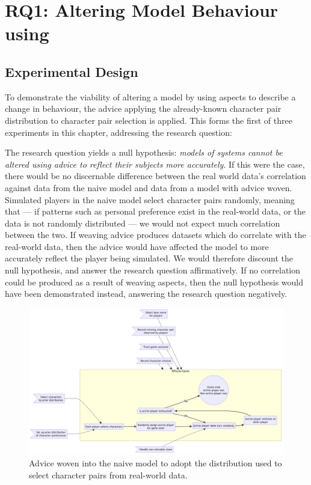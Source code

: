 \section{RQ1: Altering Model Behaviour using \AspectOrientation}
\label{sec:rq2}

\subsection{Experimental Design}

To demonstrate the viability of altering a model by using aspects to describe a
change in behaviour, the advice applying the already-known character pair
distribution to character pair selection is applied. This forms the first of
three experiments in this chapter, addressing the research question:

\begin{researchquestion}
\rqtwo{}
\end{researchquestion}

The research question yields a null hypothesis: \emph{models of systems cannot
be altered using advice to reflect their subjects more accurately}. If this were
the case, there would be no discernable difference between the real world data's
correlation against data from the naive model and data from a model with advice
woven. Simulated players in the naive model select character pairs randomly,
meaning that --- if patterns such as personal preference exist in the real-world
data, or the data is not randomly distributed --- we would not expect much
correlation between the two. If weaving advice produces datasets which do
correlate with the real-world data, then the advice would have affected the
model to more accurately reflect the player being simulated. We would therefore
discount the null hypothesis, and answer the research question affirmatively. If
no correlation could be produced as a result of weaving aspects, then the null
hypothesis would have been demonstrated instead, answering the research question
negatively.

\begin{figure}[h]
  \centering
  \includegraphics[width=\columnwidth]{70_generality_of_aspects/diagrams/exp2_prior_distribution_model.png}
  \caption{Advice woven into the naive model to adopt the distribution used to select character pairs from real-world data.}
  \label{fig:exp1_prior_distribution_model}
\end{figure}

